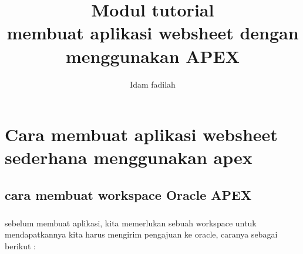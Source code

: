 \documentclass[12pt]{ociamthesis}  %
\title{Modul tutorial \\     %
membuat aplikasi websheet dengan menggunakan APEX}   %
\author{Idam fadilah}             %
\begin{document}
\maketitle
\chapter{Cara membuat aplikasi websheet sederhana menggunakan apex}
\paragraph{}


\section{cara membuat workspace Oracle APEX}
\paragraph{}
sebelum membuat aplikasi, kita memerlukan sebuah workspace untuk mendapatkannya kita harus mengirim pengajuan ke oracle, caranya sebagai berikut : 
\end{document}
